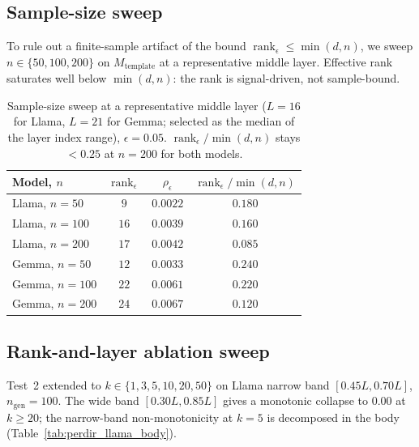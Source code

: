 \documentclass[10pt]{article}
\theoremstyle{definition}
\theoremstyle{remark}
\begin{document}
\subsection{Sample-size sweep}
\label{app:n_sweep}

To rule out a finite-sample artifact of the bound
$\operatorname{rank}_{\epsilon}\leq \min(d,n)$, we
sweep $n \in \{50, 100, 200\}$ on
$M_{\mathrm{template}}$ at a representative middle
layer.  Effective rank saturates well below $\min(d,n)$:
the rank is signal-driven, not sample-bound.

\begin{table}[h]\centering
\caption{Sample-size sweep at a representative middle
layer ($L=16$ for Llama, $L=21$ for Gemma; selected as
the median of the layer index range), $\epsilon=0.05$.
$\operatorname{rank}_{\epsilon}/\min(d,n)$ stays
$<\!0.25$ at $n{=}200$ for both models.}
\label{tab:n_sweep}
\begin{tabular}{@{}lccc@{}}
\toprule
Model, $n$ &
$\operatorname{rank}_{\epsilon}$ &
$\rho_{\epsilon}$ &
$\operatorname{rank}_{\epsilon}/\min(d,n)$ \\
\midrule
Llama, $n{=}50$  & $9$  & $0.0022$ & $0.180$ \\
Llama, $n{=}100$ & $16$ & $0.0039$ & $0.160$ \\
Llama, $n{=}200$ & $17$ & $0.0042$ & $0.085$ \\
\midrule
Gemma, $n{=}50$  & $12$ & $0.0033$ & $0.240$ \\
Gemma, $n{=}100$ & $22$ & $0.0061$ & $0.220$ \\
Gemma, $n{=}200$ & $24$ & $0.0067$ & $0.120$ \\
\bottomrule
\end{tabular}
\end{table}

\subsection{Rank-and-layer ablation sweep}
\label{app:abl_sweep}

Test~2 extended to $k \in \{1,3,5,10,20,50\}$ on Llama
narrow band $[0.45L, 0.70L]$, $n_{\mathrm{gen}} = 100$.
The wide band $[0.30L, 0.85L]$ gives a monotonic
collapse to $\mathbf{0.00}$ at $k \geq 20$; the
narrow-band non-monotonicity at $k=5$ is decomposed in
the body (Table~\ref{tab:perdir_llama_body}).
\end{document}
